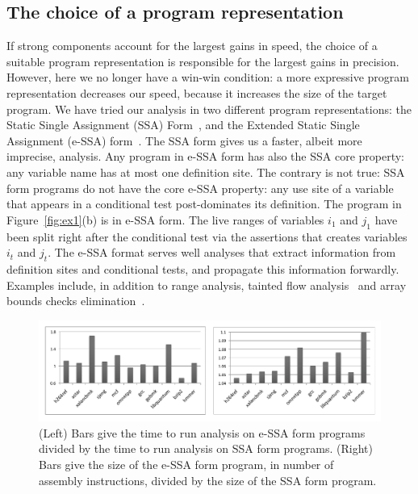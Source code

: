\documentclass[preprint]{elsarticle}
\begin{document}
\subsection{The choice of a program representation}
\label{sub:program_rep}

If strong components account for the largest gains in speed, the choice of
a suitable program representation is responsible for the largest gains in
precision.
However, here we no longer have a win-win condition: a more expressive
program representation decreases our speed, because it increases the
size of the target program.
We have tried our analysis in two different program representations: the
Static Single Assignment (SSA) Form~\cite{Cytron91}, and the Extended Static
Single Assignment (e-SSA) form~\cite{Bodik00}.
The SSA form gives us a faster, albeit more imprecise, analysis.
Any program in e-SSA form has also the SSA core property: any variable name
has at most one definition site.
The contrary is not true: SSA form programs do not have the core e-SSA
property: any use site of a variable that appears in a conditional test
post-dominates its definition.
The program in Figure~\ref{fig:ex1}(b) is in e-SSA form.
The live ranges of variables $i_1$ and $j_1$ have been split right after the
conditional test via the assertions that creates variables $i_t$ and $j_t$.
The e-SSA format serves well analyses that extract information from definition
sites and conditional tests, and propagate this information forwardly.
Examples include, in addition to range analysis, tainted flow
analysis~\cite{Rimsa11} and array bounds checks elimination~\cite{Bodik00}.

\begin{figure}[t!]
\begin{center}
\includegraphics[width=1\textwidth]{images/impactESSA}
\end{center}
\caption{\label{fig:impactESSA}
(Left) Bars give the time to run analysis on e-SSA form programs divided by
the time to run analysis on SSA form programs.
(Right) Bars give the size of the e-SSA form program, in number of
assembly instructions, divided by the size of the SSA form program.}
\end{figure}
\end{document}

